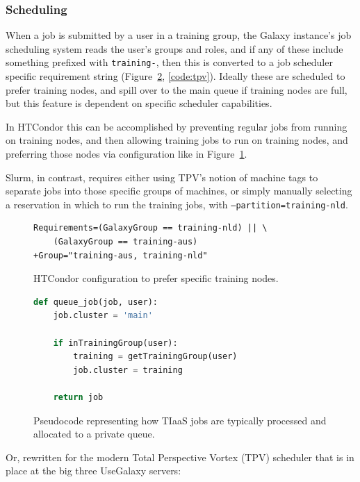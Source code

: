 \documentclass[a4paper,num-refs]{oup-contemporary}
\begin{document}
\subsubsection{Scheduling}
When a job is submitted by a user in a training group, the Galaxy instance's job scheduling system reads the user's groups and roles, and if any of these include something prefixed with \texttt{training-}, then this is converted to a job scheduler specific requirement string (Figure~\ref{code:scheduler}, \ref{code:tpv}). Ideally these are scheduled to prefer training nodes, and spill over to the main queue if training nodes are full, but this feature is dependent on specific scheduler capabilities. 

In HTCondor this can be accomplished by preventing regular jobs from running on training nodes, and then allowing training jobs to run on training nodes, and preferring those nodes via configuration like in Figure~\ref{code:condorprefer}.

Slurm, in contrast, requires either using TPV's notion of machine tags to separate jobs into those specific groups of machines, or simply manually selecting a reservation in which to run the training jobs, with \texttt{--partition=training-nld}.

\begin{figure}[!ht]
\centering
\begin{lstlisting}[frame=single]  % Start your code-block
Requirements=(GalaxyGroup == training-nld) || \
    (GalaxyGroup == training-aus)
+Group="training-aus, training-nld"
\end{lstlisting}
\caption{HTCondor configuration to prefer specific training nodes.\label{code:condorprefer}}
\end{figure}



\begin{figure}[!ht]
\centering
\begin{lstlisting}[frame=single,language=Python]  % Start your code-block
def queue_job(job, user):
    job.cluster = 'main'

    if inTrainingGroup(user):
        training = getTrainingGroup(user)
        job.cluster = training

    return job
\end{lstlisting}
\caption{Pseudocode representing how TIaaS jobs are typically processed and allocated to a private queue.\label{code:scheduler}}
\end{figure}

Or, rewritten for the modern Total Perspective Vortex (TPV) scheduler that is in place at the big three UseGalaxy servers:
\end{document}
